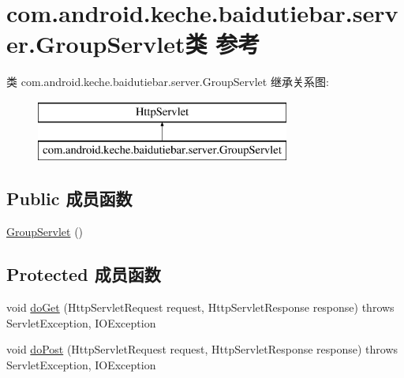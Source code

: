 \hypertarget{classcom_1_1android_1_1keche_1_1baidutiebar_1_1server_1_1_group_servlet}{}\section{com.\+android.\+keche.\+baidutiebar.\+server.\+Group\+Servlet类 参考}
\label{classcom_1_1android_1_1keche_1_1baidutiebar_1_1server_1_1_group_servlet}
类 com.\+android.\+keche.\+baidutiebar.\+server.\+Group\+Servlet 继承关系图\+:\begin{figure}[H]
\begin{center}
\leavevmode
\includegraphics[height=2.000000cm]{classcom_1_1android_1_1keche_1_1baidutiebar_1_1server_1_1_group_servlet}
\end{center}
\end{figure}
\subsection*{Public 成员函数}
\begin{DoxyCompactItemize}
\item 
\mbox{\hyperlink{classcom_1_1android_1_1keche_1_1baidutiebar_1_1server_1_1_group_servlet_afe9741000f3e3939a050be653dcdfea6}{Group\+Servlet}} ()
\end{DoxyCompactItemize}
\subsection*{Protected 成员函数}
\begin{DoxyCompactItemize}
\item 
void \mbox{\hyperlink{classcom_1_1android_1_1keche_1_1baidutiebar_1_1server_1_1_group_servlet_ad037d3fc8d03e2c707d34e17fa8bf49b}{do\+Get}} (Http\+Servlet\+Request request, Http\+Servlet\+Response response)  throws Servlet\+Exception, I\+O\+Exception 
\item 
void \mbox{\hyperlink{classcom_1_1android_1_1keche_1_1baidutiebar_1_1server_1_1_group_servlet_aa9b08b4da3a8fde05198fa1e6aec01ca}{do\+Post}} (Http\+Servlet\+Request request, Http\+Servlet\+Response response)  throws Servlet\+Exception, I\+O\+Exception 
\end{DoxyCompactItemize}


